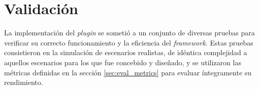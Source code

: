 \chapter{Validación}\label{cap:validacion}

La implementación del \emph{plugin} se sometió a un conjunto de diversas pruebas para verificar su correcto funcionamiento y la eficiencia del \emph{framework}. Estas pruebas consistieron en la simulación de escenarios realistas, de idéntica complejidad a aquellos escenarios para los que fue concebido y diseñado, y se utilizaron las métricas definidas en la sección \ref{sec:eval_metrics} para evaluar íntegramente su rendimiento.



